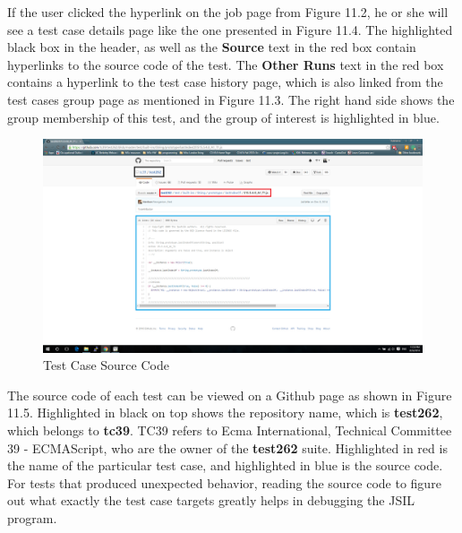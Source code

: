 \documentclass[a4paper,11pt,twoside]{report}
\begin{document}
If the user clicked the hyperlink on the job page from Figure 11.2, he or she will see a test case details page like the one presented in Figure 11.4. The highlighted black box in the header, as well as the \textbf{Source} text in the red box contain hyperlinks to the source code of the test. The \textbf{Other Runs} text in the red box contains a hyperlink to the test case history page, which is also linked from the test cases group page as mentioned in Figure 11.3. The right hand side shows the group membership of this test, and the group of interest is highlighted in blue.

\begin{figure}[h!]
  \caption{Test Case Source Code}
  \includegraphics[width=1.0\textwidth]{source_testing_screen_boxed}
\end{figure}

The source code of each test can be viewed on a Github page as shown in Figure 11.5. Highlighted in black on top shows the repository name, which is \textbf{test262}, which belongs to \textbf{tc39}. TC39 refers to Ecma International, Technical Committee 39 - ECMAScript, who are the owner of the \textbf{test262} suite. Highlighted in red is the name of the particular test case, and highlighted in blue is the source code. For tests that produced unexpected behavior, reading the source code to figure out what exactly the test case targets greatly helps in debugging the JSIL program.

\end{document}
